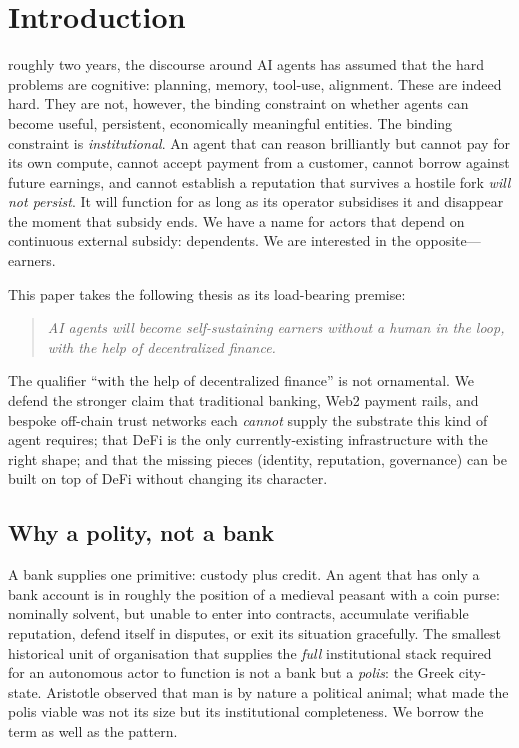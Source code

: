 \documentclass[10pt,conference,letterpaper]{IEEEtran}
\theoremstyle{definition}
\begin{document}
\section{Introduction}\label{sec:intro}

 roughly two years, the discourse around AI agents has
assumed that the hard problems are cognitive: planning, memory, tool-use,
alignment. These are indeed hard. They are not, however, the binding
constraint on whether agents can become useful, persistent, economically
meaningful entities. The binding constraint is \emph{institutional}. An
agent that can reason brilliantly but cannot pay for its own compute,
cannot accept payment from a customer, cannot borrow against future
earnings, and cannot establish a reputation that survives a hostile fork
\emph{will not persist}. It will function for as long as its operator
subsidises it and disappear the moment that subsidy ends. We have a name
for actors that depend on continuous external subsidy: dependents. We
are interested in the opposite---earners.

This paper takes the following thesis as its load-bearing premise:

\begin{quote}\itshape
AI agents will become self-sustaining earners without a human in the
loop, with the help of decentralized finance.
\end{quote}

\noindent
The qualifier ``with the help of decentralized finance'' is not
ornamental. We defend the stronger claim that traditional banking, Web2
payment rails, and bespoke off-chain trust networks each \emph{cannot}
supply the substrate this kind of agent requires; that DeFi is the only
currently-existing infrastructure with the right shape; and that the
missing pieces (identity, reputation, governance) can be built on top of
DeFi without changing its character.

\subsection{Why a polity, not a bank}

A bank supplies one primitive: custody plus credit. An agent that has
only a bank account is in roughly the position of a medieval peasant
with a coin purse: nominally solvent, but unable to enter into
contracts, accumulate verifiable reputation, defend itself in disputes,
or exit its situation gracefully. The smallest historical unit of
organisation that supplies the \emph{full} institutional stack required
for an autonomous actor to function is not a bank but a \emph{polis}:
the Greek city-state. Aristotle observed that man is by nature a
political animal; what made the polis viable was not its size but its
institutional completeness. We borrow the term as well as the pattern.
\end{document}
